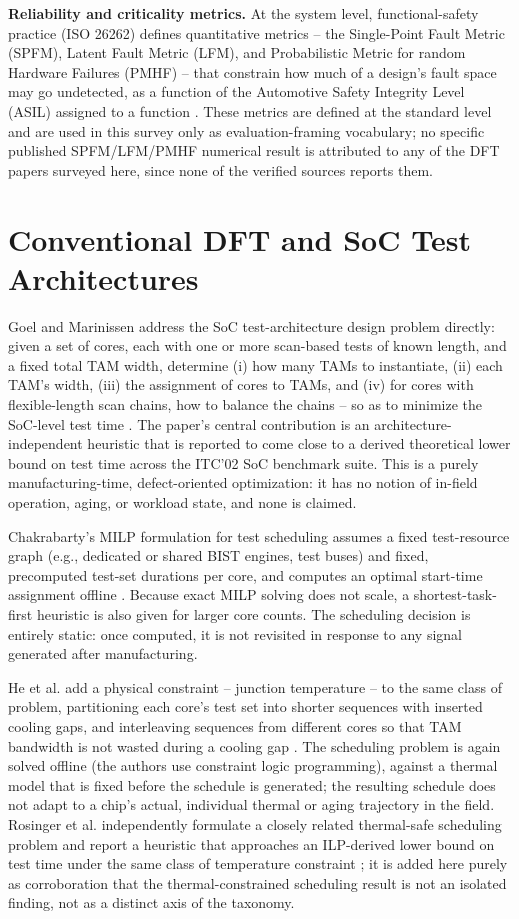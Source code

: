 \documentclass[journal]{IEEEtran}
\begin{document}
\textbf{Reliability and criticality metrics.} At the system level, functional-safety practice (ISO 26262) defines quantitative metrics -- the Single-Point Fault Metric (SPFM), Latent Fault Metric (LFM), and Probabilistic Metric for random Hardware Failures (PMHF) -- that constrain how much of a design's fault space may go undetected, as a function of the Automotive Safety Integrity Level (ASIL) assigned to a function \cite{r10}. These metrics are defined at the standard level and are used in this survey only as evaluation-framing vocabulary; no specific published SPFM/LFM/PMHF numerical result is attributed to any of the DFT papers surveyed here, since none of the verified sources reports them.

\section{Conventional DFT and SoC Test Architectures}
Goel and Marinissen address the SoC test-architecture design problem directly: given a set of cores, each with one or more scan-based tests of known length, and a fixed total TAM width, determine (i) how many TAMs to instantiate, (ii) each TAM's width, (iii) the assignment of cores to TAMs, and (iv) for cores with flexible-length scan chains, how to balance the chains -- so as to minimize the SoC-level test time \cite{r1}. The paper's central contribution is an architecture-independent heuristic that is reported to come close to a derived theoretical lower bound on test time across the ITC'02 SoC benchmark suite. This is a purely manufacturing-time, defect-oriented optimization: it has no notion of in-field operation, aging, or workload state, and none is claimed.

Chakrabarty's MILP formulation for test scheduling assumes a fixed test-resource graph (e.g., dedicated or shared BIST engines, test buses) and fixed, precomputed test-set durations per core, and computes an optimal start-time assignment offline \cite{r2}. Because exact MILP solving does not scale, a shortest-task-first heuristic is also given for larger core counts. The scheduling decision is entirely static: once computed, it is not revisited in response to any signal generated after manufacturing.

He et al. add a physical constraint -- junction temperature -- to the same class of problem, partitioning each core's test set into shorter sequences with inserted cooling gaps, and interleaving sequences from different cores so that TAM bandwidth is not wasted during a cooling gap \cite{r3}. The scheduling problem is again solved offline (the authors use constraint logic programming), against a thermal model that is fixed before the schedule is generated; the resulting schedule does not adapt to a chip's actual, individual thermal or aging trajectory in the field. Rosinger et al. independently formulate a closely related thermal-safe scheduling problem and report a heuristic that approaches an ILP-derived lower bound on test time under the same class of temperature constraint \cite{r12}; it is added here purely as corroboration that the thermal-constrained scheduling result is not an isolated finding, not as a distinct axis of the taxonomy.
\end{document}

